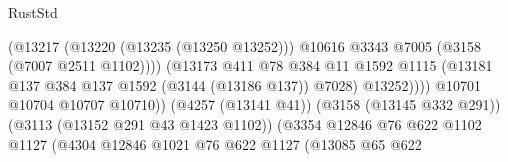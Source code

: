 \begin{lexlean}{RustStd}
\begin{coremodule}
                                                        (@13217
                                                          (@13220 (@13235 (@13250 @13252)))
                                                          @10616
                                                          @3343
                                                          @7005
                                                          (@3158 (@7007 @2511 @1102))))
                                                      (@13173
                                                        @411
                                                        @78
                                                        @384
                                                        @11
                                                        @1592
                                                        @1115
                                                        (@13181
                                                          @137
                                                          @384
                                                          @137
                                                          @1592
                                                          (@3144 (@13186 @137))
                                                          @7028)
                                                        @13252))))
                                                @10701
                                                @10704
                                                @10707
                                                @10710))
                                            (@4257 (@13141 @41))
                                            (@3158 (@13145 @332 @291))
                                            (@3113 (@13152 @291 @43 @1423 @1102))
                                            (@3354
                                              @12846
                                              @76
                                              @622
                                              @1102
                                              @1127
                                              (@4304
                                                @12846
                                                @1021
                                                @76
                                                @622
                                                @1127
                                                (@13085
                                                  @65
                                                  @622

\end{coremodule}
\end{lexlean}
